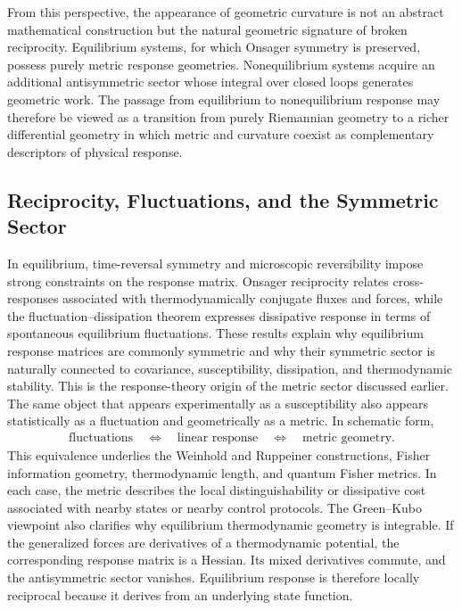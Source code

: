 From this perspective, the appearance of geometric curvature is
not an abstract mathematical construction but the natural
geometric signature of broken reciprocity. Equilibrium systems,
for which Onsager symmetry is preserved, possess purely metric
response geometries. Nonequilibrium systems acquire an additional
antisymmetric sector whose integral over closed loops generates
geometric work. The passage from equilibrium to nonequilibrium
response may therefore be viewed as a transition from purely
Riemannian geometry to a richer differential geometry in which
metric and curvature coexist as complementary descriptors of
physical response.

\subsection{Reciprocity, Fluctuations, and the Symmetric Sector}

In equilibrium, time-reversal symmetry and microscopic
reversibility impose strong constraints on the response matrix.
Onsager reciprocity relates cross-responses associated with
thermodynamically conjugate fluxes and forces, while the
fluctuation--dissipation theorem expresses dissipative response
in terms of spontaneous equilibrium fluctuations. These results
explain why equilibrium response matrices are commonly
symmetric and why their symmetric sector is naturally connected
to covariance, susceptibility, dissipation, and thermodynamic
stability.
This is the response-theory origin of the metric sector discussed
earlier. The same object that appears experimentally as a
susceptibility also appears statistically as a fluctuation and
geometrically as a metric. In schematic form,
\begin{align}
\textrm{fluctuations}
\quad\Longleftrightarrow\quad
\textrm{linear response}
\quad\Longleftrightarrow\quad
\textrm{metric geometry}.
\end{align}
This equivalence underlies the Weinhold and Ruppeiner
constructions, Fisher information geometry, thermodynamic
length, and quantum Fisher metrics. In each case, the metric
describes the local distinguishability or dissipative cost
associated with nearby states or nearby control protocols.
The Green--Kubo viewpoint also clarifies why equilibrium
thermodynamic geometry is integrable. If the generalized forces
are derivatives of a thermodynamic potential, the corresponding
response matrix is a Hessian. Its mixed derivatives commute, and
the antisymmetric sector vanishes. Equilibrium response is
therefore locally reciprocal because it derives from an underlying
state function.

